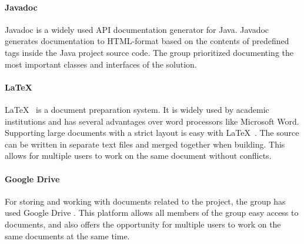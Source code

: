 \paragraph*{Javadoc}
Javadoc \cite{javadoc} is a widely used API documentation generator for Java. Javadoc generates documentation to HTML-format based on the contents of predefined tags inside the Java project source code. The group prioritized documenting the most important classes and interfaces of the solution.

\paragraph*{\LaTeX}
\LaTeX\ \cite{latex} is a document preparation system. It is widely used by academic institutions and has several advantages over word processors like Microsoft Word. Supporting large documents with a strict layout is easy with \LaTeX\ . The source can be written in separate text files and merged together when building. This allows for multiple users to work on the same document without conflicts.

\paragraph*{Google Drive}
For storing and working with documents related to the project, the group has used Google Drive \cite{googledrive}. This platform allows all members of the group easy access to documents, and also offers the opportunity for multiple users to work on the same documents at the same time.